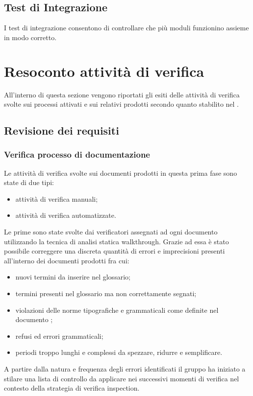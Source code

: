 	\subsection{Test di Integrazione}
	I test di integrazione consentono di controllare che più moduli funzionino assieme in modo corretto.
	



\section{Resoconto attività di verifica}
All'interno di questa sezione vengono riportati gli esiti delle attività di verifica svolte sui processi attivati e sui relativi prodotti secondo quanto stabilito nel \PdP.
	\subsection{Revisione dei requisiti}
		\subsubsection{Verifica processo di documentazione}
		Le attività di verifica svolte sui documenti prodotti in questa prima fase sono state di due tipi:
		\begin{itemize}		
			\item attività di verifica manuali;
			\item attività di verifica automatizzate.
		\end{itemize}
		
		Le prime sono state svolte dai verificatori assegnati ad ogni documento utilizzando la tecnica di 					analisi statica walkthrough. Grazie ad essa è stato possibile correggere una discreta quantità di 					errori e imprecisioni presenti all'interno dei documenti prodotti fra cui: 
		\begin{itemize}	
			\item nuovi termini da inserire nel glossario;
			\item termini presenti nel glossario ma non correttamente segnati;
			\item violazioni delle norme tipografiche e grammaticali come definite nel documento \NdP ;
			\item refusi ed errori grammaticali;
			\item periodi troppo lunghi e complessi da spezzare, ridurre e semplificare.
		\end{itemize}
		A partire dalla natura e frequenza degli errori identificati il gruppo ha iniziato a stilare una lista
		di controllo da applicare nei successivi momenti di verifica nel contesto della strategia di verifica
		inspection.

